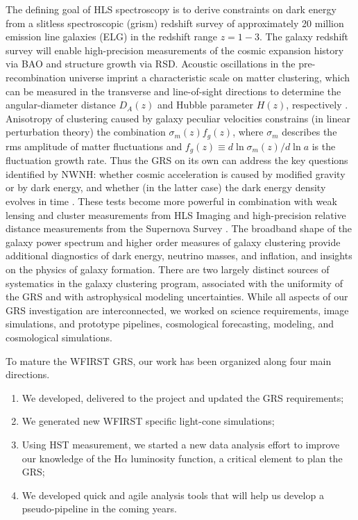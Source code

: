 The defining goal of HLS spectroscopy is to derive constraints on dark energy
from a slitless spectroscopic (grism) redshift survey of approximately 20
million emission line galaxies (ELG) in the redshift range $z=1-3$. The galaxy
redshift survey will enable high-precision measurements of the cosmic expansion
history via BAO and structure growth via RSD. Acoustic oscillations in the
pre-recombination universe imprint a characteristic scale on matter clustering,
which can be measured in the transverse and line-of-sight directions to
determine the angular-diameter distance $D_A(z)$ and Hubble parameter $H(z)$,
respectively \citep{Blake03,Seo03,CW12}.  Anisotropy of clustering caused by
galaxy peculiar velocities constrains (in linear perturbation theory) the
combination $\sigma_m(z) f_g(z)$, where $\sigma_m$ describes the rms amplitude
of matter fluctuations and $f_g(z) \equiv d\ln\sigma_m(z)/d\ln a$ is the
fluctuation growth rate. Thus the GRS on its own can address the key questions
identified by NWNH\@: whether cosmic acceleration is caused by modified gravity
or by dark energy, and whether (in the latter case) the dark energy density
evolves in time \citep{Guzzo08,Wang08}.  These tests become more powerful in
combination with weak lensing and cluster measurements from HLS Imaging and
high-precision relative distance measurements from the Supernova Survey
\citep{dePutter:2013xda,dePutter:2013nha}. The broadband shape of the galaxy
power spectrum and higher order measures of galaxy clustering provide additional
diagnostics of dark energy, neutrino masses, and inflation, and insights on the
physics of galaxy formation. There are two largely distinct sources of
systematics in the galaxy clustering program, associated with the uniformity of
the GRS and with astrophysical modeling uncertainties. While all aspects of our
GRS investigation are interconnected, we worked on science requirements, image simulations,
and prototype pipelines, cosmological forecasting, modeling, and cosmological simulations.

\begin{summary}
To mature the WFIRST GRS, our work has been organized along four main directions.
\begin{enumerate}
\item We developed, delivered to the project and updated the GRS requirements;
\item We generated new WFIRST specific light-cone simulations;
\item Using HST measurement, we started a new data analysis effort to improve our knowledge of the H$\alpha$ luminosity function, a critical element to plan the GRS;
\item We developed quick and agile analysis tools that will help us develop a pseudo-pipeline in the coming years.
\end{enumerate}
\end{summary}


